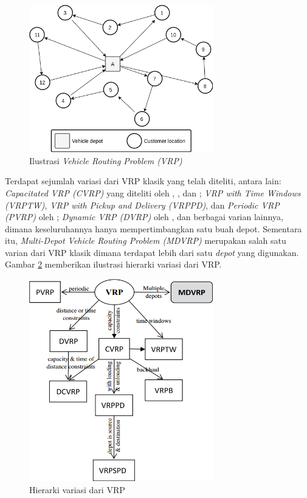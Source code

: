 \begin{figure}[h]
	\centering
	\includegraphics[width=8cm]{Resources/Images/vrp-ilustration}
	\caption{Ilustrasi \textit{Vehicle Routing Problem (VRP)}}
	\label{fig:vrp-ilustration}
\end{figure}


Terdapat sejumlah variasi dari VRP klasik yang telah diteliti, antara lain: \textit{Capacitated VRP (CVRP)} yang diteliti oleh \citep{baldacci_exact_2010}, \citep{cordeau_chapter_2007}, dan \citep{toth_vehicle_2002}; \textit{VRP with Time Windows (VRPTW)}, \textit{VRP with Pickup and Delivery (VRPPD)}, dan \textit{Periodic VRP (PVRP)} oleh \citep{solomon_survey_1988}; \textit{Dynamic VRP (DVRP)} oleh \citep{psaraftis_dynamic_1995}, dan berbagai varian lainnya, dimana keseluruhannya hanya mempertimbangkan satu buah depot. Sementara itu, \textit{Multi-Depot Vehicle Routing Problem (MDVRP)} merupakan salah satu varian dari VRP klasik dimana terdapat lebih dari satu \textit{depot} yang digunakan. Gambar \ref{fig:vrp-variants} memberikan ilustrasi hierarki variasi dari VRP.


\begin{figure}[h]
	\centering
	\includegraphics[width=8cm]{Resources/Images/vrp-variants}
	\caption{Hierarki variasi dari VRP \citep{weise_solving_2009}}
	\label{fig:vrp-variants}
\end{figure}


